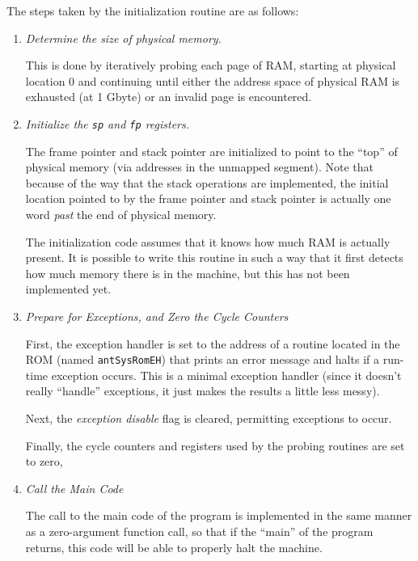 The steps taken by the initialization routine are as follows:

\begin{enumerate}

\item	{\em Determine the size of physical memory.}

	This is done by iteratively probing each page of RAM, starting
	at physical location 0 and continuing until either the address
	space of physical RAM is exhausted (at 1 Gbyte) or an invalid
	page is encountered. 

\item	{\em Initialize the {\tt sp} and {\tt fp} registers.}

	The frame pointer and stack pointer are initialized to point
	to the ``top'' of physical memory (via addresses in the
	unmapped segment).  Note that because of the way that the
	stack operations are implemented, the initial location pointed
	to by the frame pointer and stack pointer is actually one word
	{\em past} the end of physical memory.

	The initialization code assumes that it knows how much RAM is
	actually present.  It is possible to write this routine in
	such a way that it first detects how much memory there is in
	the machine, but this has not been implemented yet.
	
\item	{\em Prepare for Exceptions, and Zero the Cycle Counters}

	First, the exception handler is set to the address of a
	routine located in the ROM (named {\tt antSysRomEH}) that
	prints an error message and halts if a run-time exception
	occurs.  This is a minimal exception handler (since it
	doesn't really ``handle'' exceptions, it just makes the
	results a little less messy).

	Next, the {\em exception disable} flag is cleared, permitting
	exceptions to occur.

	Finally, the cycle counters and registers used by the
	probing routines are set to zero, 

\item	{\em Call the Main Code}

	The call to the main code of the program is implemented in the
	same manner as a zero-argument function call, so that if the
	``main'' of the program returns, this code will be able to
	properly halt the machine.

\end{enumerate}

